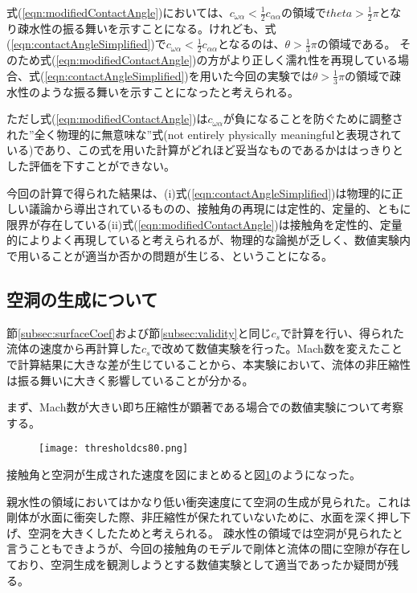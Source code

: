 \documentclass[]{jsarticle}
\begin{document}
式(\ref{eqn:modifiedContactAngle})においては、$c_{\omega\alpha}<\frac{1}{2}c_{\alpha\alpha}$の領域で$theta>\frac{1}{2}\pi$となり疎水性の振る舞いを示すことになる。けれども、式(\ref{eqn:contactAngleSimplified})で$c_{\omega\alpha}<\frac{1}{2}c_{\alpha\alpha}$となるのは、$\theta>\frac{1}{3}\pi$の領域である。
そのため式(\ref{eqn:modifiedContactAngle})の方がより正しく濡れ性を再現している場合、式(\ref{eqn:contactAngleSimplified})を用いた今回の実験では$\theta>\frac{1}{3}\pi$の領域で疎水性のような振る舞いを示すことになったと考えられる。

ただし式(\ref{eqn:modifiedContactAngle})は$c_{\omega\alpha}$が負になることを防ぐために調整された”全く物理的に無意味な”式(not entirely physically meaningfulと表現されている)であり、この式を用いた計算がどれほど妥当なものであるかははっきりとした評価を下すことができない。

今回の計算で得られた結果は、(i)式(\ref{eqn:contactAngleSimplified})は物理的に正しい議論から導出されているものの、接触角の再現には定性的、定量的、ともに限界が存在している(ii)式(\ref{eqn:modifiedContactAngle})は接触角を定性的、定量的によりよく再現していると考えられるが、物理的な論拠が乏しく、数値実験内で用いることが適当か否かの問題が生じる、ということになる。

\subsection{空洞の生成について}
\label{subsec:discCavityForm}
節\ref{subsec:surfaceCoef}および節\ref{subsec:validity}と同じ$c_s$で計算を行い、得られた流体の速度から再計算した$c_s$で改めて数値実験を行った。Mach数を変えたことで計算結果に大きな差が生じていることから、本実験において、流体の非圧縮性は振る舞いに大きく影響していることが分かる。

まず、Mach数が大きい即ち圧縮性が顕著である場合での数値実験について考察する。
\begin{figure}[ht]
  \centering
  \texttt{[image: thresholdcs80.png]}
  \caption{\label{fig:threscs80} }
\end{figure}

接触角と空洞が生成された速度を図にまとめると図\ref{fig:threscs80}のようになった。

親水性の領域においてはかなり低い衝突速度にて空洞の生成が見られた。これは剛体が水面に衝突した際、非圧縮性が保たれていないために、水面を深く押し下げ、空洞を大きくしたためと考えられる。
疎水性の領域では空洞が見られたと言うこともできようが、今回の接触角のモデルで剛体と流体の間に空隙が存在しており、空洞生成を観測しようとする数値実験として適当であったか疑問が残る。
\end{document}
